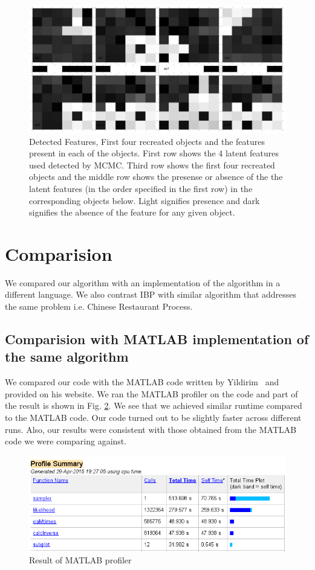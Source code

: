 \documentclass{article}
\begin{document}
\begin{figure}[ht]
\includegraphics[width=\linewidth]{figures/Detected.png}
\caption {Detected Features, First four recreated objects and the features present in each of the objects. First row shows the 4 latent features used detected by MCMC. Third row shows the first four recreated objects and the middle row shows the presense or absence of the the latent features (in the order specified in the first row) in the corresponding objects below. Light signifies presence and dark signifies the absence of the feature for any given object.}
\label{fig:detected}
\end{figure}

\section{Comparision}
We compared our algorithm with an implementation of the algorithm in a different language. We also contrast IBP with similar algorithm that addresses the same problem i.e. Chinese Restaurant Process.
\subsection{Comparision with MATLAB implementation of the same algorithm}
We compared our code with the MATLAB code written by Yildirim~\cite{yildirimweb} and provided on his website. We ran the MATLAB profiler on the code and part of the result is shown in Fig. \ref{fig:profilematlab}. We see that we achieved similar runtime compared to the MATLAB code. Our code turned out to be slightly faster across different runs. Also, our results were consistent with those obtained from the MATLAB code we were comparing against.
\begin{figure}[H]
\includegraphics[width=\linewidth]{MatlabProfile.PNG}
\caption{Result of MATLAB profiler}
\label{fig:profilematlab}
\end{figure}
\end{document}
